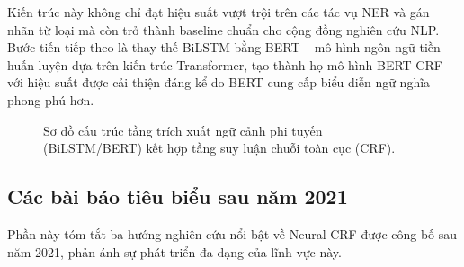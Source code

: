 \begin{expandbox}
Kiến trúc này không chỉ đạt hiệu suất vượt trội trên các tác vụ NER và gán nhãn từ loại mà còn trở thành baseline chuẩn cho cộng đồng nghiên cứu NLP. Bước tiến tiếp theo là thay thế BiLSTM bằng BERT \cite{devlin2019bert} -- mô hình ngôn ngữ tiền huấn luyện dựa trên kiến trúc Transformer, tạo thành họ mô hình BERT-CRF với hiệu suất được cải thiện đáng kể do BERT cung cấp biểu diễn ngữ nghĩa phong phú hơn.

\begin{figure}[H]
\centering
\caption{Sơ đồ cấu trúc tầng trích xuất ngữ cảnh phi tuyến (BiLSTM/BERT) kết hợp tầng suy luận chuỗi toàn cục (CRF).}
\label{fig:bilstm_crf_layout}
\end{figure}

\subsection{Các bài báo tiêu biểu sau năm 2021}
\label{ssec:recent_crf_papers}
Phần này tóm tắt ba hướng nghiên cứu nổi bật về Neural CRF được công bố sau năm 2021, phản ánh sự phát triển đa dạng của lĩnh vực này.


\end{expandbox}
